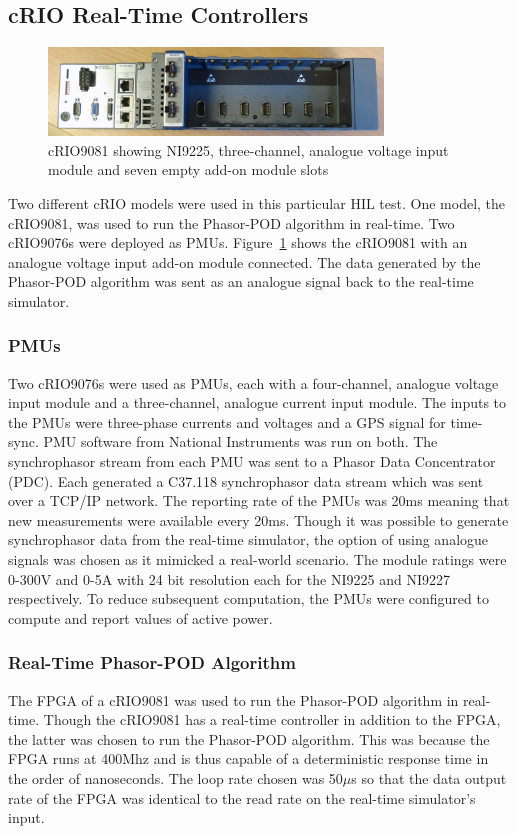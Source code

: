 \documentclass[conference]{IEEEtran}
\begin{document}
\subsection{cRIO Real-Time Controllers}
\begin{figure}[H]
\centering
\includegraphics[width=3.5in]{DSC05446.JPG}
\vspace{-0.5em}
\caption{cRIO9081 showing NI9225, three-channel, analogue voltage input module and seven empty add-on module slots}
\label{cRIO}
\end{figure}
Two different cRIO models were used in this particular HIL test. One model, the cRIO9081, was used to run the Phasor-POD algorithm in real-time. Two cRIO9076s were deployed as PMUs. Figure~\ref{cRIO} shows the cRIO9081 with an analogue voltage input add-on module connected. The data generated by the Phasor-POD algorithm was sent as an analogue signal back to the real-time simulator. 

\subsubsection*{PMUs} Two cRIO9076s were used as PMUs, each with a four-channel, analogue voltage input module and a three-channel, analogue current input module. The inputs to the PMUs were three-phase currents and voltages and a GPS signal for time-sync. PMU software from National Instruments was run on both. The synchrophasor stream from each PMU was sent to a Phasor Data Concentrator (PDC). Each generated a C37.118 synchrophasor data stream which was sent over a TCP/IP network. The reporting rate of the PMUs was 20ms meaning that new measurements were available every 20ms. Though it was possible to generate synchrophasor data from the real-time simulator, the option of using analogue signals was chosen as it mimicked a real-world scenario. The module ratings were 0-300V and 0-5A with 24 bit resolution each\cite{cRIO9081} for the NI9225 and NI9227 respectively. To reduce subsequent computation, the PMUs were configured to compute and report values of active power.

\subsubsection*{Real-Time Phasor-POD Algorithm} The FPGA of a cRIO9081 was used to run the Phasor-POD algorithm in real-time. Though the cRIO9081 has a real-time controller in addition to the FPGA, the latter was chosen to run the Phasor-POD algorithm. This was because the FPGA runs at 400Mhz and is thus capable of a deterministic response time in the order of nanoseconds. The loop rate chosen was 50$\mu$s so that the data output rate of the FPGA was identical to the read rate on the real-time simulator's input.
\end{document}
